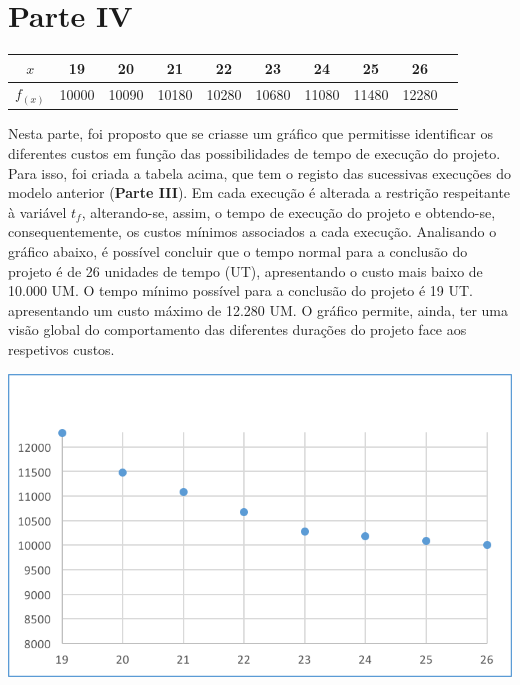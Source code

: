 \documentclass[11pt,titlepage,contentspage,a4paper]{article} %
\begin{document}
\section{Parte IV}
	\vspace{20pt}
	\begin{center}
		\begin{tabular}{|c|c|c|c|c|c|c|c|c|c|}\hline
			$x$&19&20&21&22&23&24&25&26 \\ \hline
			$f_(x)$&10000&10090&10180&10280&10680&11080&11480&12280 \\ \hline
	\end{tabular}
	\end{center}
	\vspace{20pt}
	Nesta parte, foi proposto que se criasse um gráfico que permitisse identificar os diferentes custos em função das possibilidades de tempo de execução do projeto. Para isso, foi criada a tabela acima, que tem o registo das sucessivas execuções do modelo anterior (\textbf{Parte III}). Em cada execução é alterada a restrição respeitante à variável $t_f$, alterando-se, assim, o tempo de execução do projeto e obtendo-se, consequentemente, os custos mínimos associados a cada execução.
	Analisando o gráfico abaixo, é possível concluir que o tempo normal para a conclusão do projeto é de 26 unidades de tempo (UT), apresentando o custo mais baixo de 10.000 UM. O tempo mínimo possível para a conclusão do projeto é 19 UT. apresentando um custo máximo de 12.280 UM. 
	O gráfico permite, ainda, ter uma visão global do comportamento das diferentes durações do projeto face aos respetivos custos.
	
	\begin{center}
		\includegraphics[width=\textwidth]{grafico.png}
	\end{center}
\end{document}
